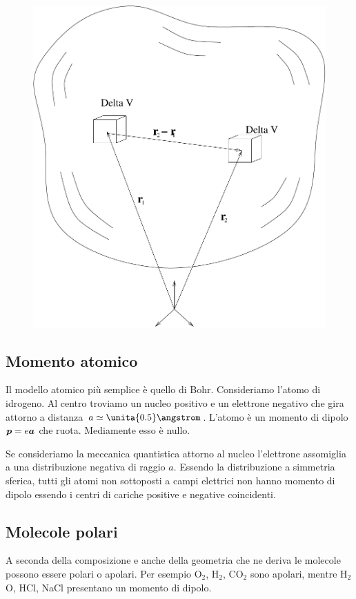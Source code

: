 \begin{figure}[htbp]
\centering
\includegraphics[scale=0.3]{immagini/fisica2/distr_dipoli}
\end{figure}
\subsection{Momento atomico}
Il modello atomico più semplice è quello di Bohr. Consideriamo l'atomo di idrogeno. Al centro troviamo un nucleo positivo e un elettrone negativo che gira attorno a distanza $a\simeq \unita{0.5}\angstrom$. L'atomo è un momento di dipolo $\boldsymbol{p}=e\boldsymbol{a}$ che ruota. Mediamente esso è nullo.

Se consideriamo la meccanica quantistica attorno al nucleo l'elettrone assomiglia a una distribuzione negativa di raggio $a$. Essendo la distribuzione a simmetria sferica, tutti gli atomi non sottoposti a campi elettrici non hanno momento di dipolo essendo i centri di cariche positive e negative coincidenti.
\subsection{Molecole polari}
A seconda della composizione e anche della geometria che ne deriva le molecole possono essere polari o apolari. Per esempio O$_2$, H$_2$, CO$_2$ sono apolari, mentre H$_2$O, HCl, NaCl presentano un momento di dipolo.

